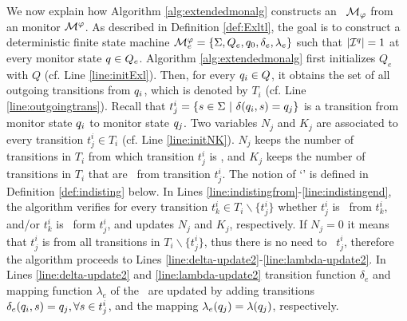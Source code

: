 We now explain how Algorithm \ref{alg:extendedmonalg} constructs an 
\Exltl~$\mathcal{M}_\varphi$ from an \LTLtri monitor $\mathcal{M}^\varphi$. As 
described in Definition \ref{def:Exltl}, the goal is to construct a 
deterministic finite state machine $\mathcal{M}^\varphi_e = \{ \Sigma, Q_e, 
q_0, \delta_e , \lambda_e\}$ such that $|\mathcal{I}^q| = 1$ at every 
monitor state $q \in Q_e$. Algorithm \ref{alg:extendedmonalg} first 
initializes $Q_e$ with $Q$ (cf. Line \ref{line:initExl}). Then, for every 
$q_i \in Q$, it obtains the set of all outgoing transitions from 
$q_i$, which is denoted by $T_i$ (cf. Line \ref{line:outgoingtrans}). 
Recall that $t_j^i = \{s \in \Sigma ~ | ~ \delta (q_i, s) 
= q_j\}$ is a transition from monitor state $q_i$ to  monitor 
state $q_j$. Two variables $N_j$ and $K_j$ are associated to every 
transition $t^i_j \in T_i$ (cf. Line \ref{line:initNK}). $N_j$ keeps the number 
of transitions in $T_i$ from which transition $t^i_j$ is \indist, and $K_j$ keeps the 
number of transitions in $T_i$ that are \textit{\indist}~from transition 
$t^i_j$. The notion of `\indist' is defined in Definition \ref{def:indisting} below. In Lines 
\ref{line:indistingfrom}-\ref{line:indistingend}, the algorithm verifies for every 
transition $t^i_k \in T_i \backslash \{t^i_j\}$ whether $t^i_j$ is \indist~from 
$t^i_k$, and/or $t^i_k$ is \indist~form $t^i_j$, and updates $N_j$ and $K_j$, 
respectively. If $N_j = 0$ it means that $t_j^i$ is \textit{\dist} from all 
transitions in $T_i \backslash \{t_j^i\}$, thus there is no need to 
\splt~$t_j^i$, therefore the algorithm proceeds to Lines 
\ref{line:delta-update2}-\ref{line:lambda-update2}. In Lines 
\ref{line:delta-update2} and \ref{line:lambda-update2} transition function 
$\delta_e$ and mapping function $\lambda_e$ of the \Exltl~are updated by adding 
transitions $\delta_e(q_i, s) = q_j , \forall s  \in 
t_j^i$, and  the mapping $\lambda_e(q_j) = \lambda(q_j)$, 
respectively.

